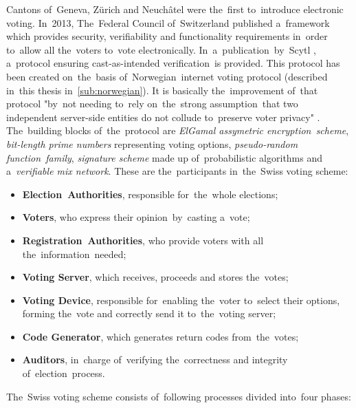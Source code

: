 Cantons of~Geneva, Zürich and Neuchâtel were the~first to~introduce electronic voting. In~2013, The~Federal Council of~Switzerland published a~framework which provides security, verifiability and functionality requirements in~order to~allow all the~voters to~vote electronically. In~a~publication~by~Scytl \cite{Swiss}, a~protocol ensuring cast-as-intended verification~is provided. This protocol has been created on~the~basis of~Norwegian~internet voting protocol (described in~this thesis in~\ref{sub:norwegian}). It is basically the~improvement of~that protocol "by~not needing to~rely on~the~strong assumption~that two independent server-side entities do not collude to~preserve voter privacy" \cite{Swiss}. The~building blocks of~the~protocol are \emph{ElGamal assymetric encryption~scheme}, \emph{bit-length prime numbers} representing voting options, \emph{pseudo-random function~family}, \emph{signature scheme} made up of~probabilistic algorithms and a~\emph{verifiable mix network}.
\bigbreak
These are the~participants in~the~Swiss voting scheme:
\begin{itemize}
\item \textbf{Election~Authorities}, responsible for~the~whole elections;
\item \textbf{Voters}, who express their opinion~by~casting a~vote;
\item \textbf{Registration~Authorities}, who provide voters with all the~information~needed;
\item \textbf{Voting Server}, which receives, proceeds and stores the~votes;
\item \textbf{Voting Device}, responsible for~enabling the~voter to~select their options, forming the~vote and correctly send it to~the~voting server;
\item \textbf{Code Generator}, which generates return codes from~the~votes;
\item \textbf{Auditors}, in~charge of~verifying the~correctness and integrity of~election~process.
\end{itemize}
\bigbreak
The~Swiss voting scheme consists of~following processes divided into~four phases:
